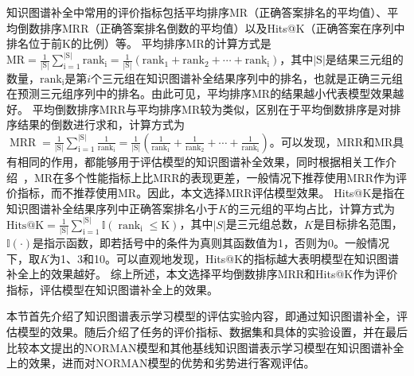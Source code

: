 \documentclass[algorithmlist, AutoFakeBold, AutoFakeSlant, figurelist, tablelist, nomlist, engineering]{seuthesix}
\begin{document}
知识图谱补全中常用的评价指标包括平均排序MR（正确答案排名的平均值）、平均倒数排序MRR（正确答案排名倒数的平均值）以及Hits@K（正确答案在序列中排名位于前K的比例）等。
平均排序MR的计算方式是$\mathrm{MR}=\frac{1}{|\mathrm{S}|} \sum_{\mathrm{i}=1}^{|\mathrm{S}|} \mathrm{rank}_{\mathrm{i}}=\frac{1}{|\mathrm{S}|}\left(\mathrm{rank}_1+\mathrm{rank}_2+\cdots+\mathrm{rank}_{\mathrm{i}}\right)$，其中$|\mathrm{S}|$是结果三元组的数量，$\mathrm{rank}_{\mathrm{i}}$是第$i$个三元组在知识图谱补全结果序列中的排名，也就是正确三元组在预测三元组序列中的排名。由此可见，平均排序MR的结果越小代表模型效果越好。
平均倒数排序MRR与平均排序MR较为类似，区别在于平均倒数排序是对排序结果的倒数进行求和，计算方式为$\operatorname{MRR}=\frac{1}{|\mathrm{S}|} \sum_{\mathrm{i}=1}^{|\mathrm{S}|} \frac{1}{\mathrm{rank}_{\mathrm{i}}}=\frac{1}{|\mathrm{S}|}\left(\frac{1}{\mathrm{rank}_1}+\frac{1}{\mathrm{rank}_2}+\cdots+\frac{1}{\mathrm{rank}_{\mathrm{i}}}\right)$。可以发现，MRR和MR具有相同的作用，都能够用于评估模型的知识图谱补全效果，同时根据相关工作介绍~\cite{hoyt2022unified}，MR在多个性能指标上比MRR的表现更差，一般情况下推荐使用MRR作为评价指标，而不推荐使用MR。因此，本文选择MRR评估模型效果。
Hits@K是指在知识图谱补全结果序列中正确答案排名小于$K$的三元组的平均占比，计算方式为$\mathrm{Hits@K}=\frac{1}{|\mathrm{S}|} \sum_{\mathrm{i}=1}^{|\mathrm{S}|} \mathbb{I}\left(\operatorname{rank}_{\mathrm{i}} \leq \mathrm{K}\right)$，其中$|S|$是三元组总数，$K$是目标排名范围，$\mathbb{I}\left(\cdot\right)$是指示函数，即若括号中的条件为真则其函数值为1，否则为0。一般情况下，取$K$为1、3和10。可以直观地发现，Hits@K的指标越大表明模型在知识图谱补全上的效果越好。
综上所述，本文选择平均倒数排序MRR和Hits@K作为评价指标，评估模型在知识图谱补全上的效果。

本节首先介绍了知识图谱表示学习模型的评估实验内容，即通过知识图谱补全，评估模型的效果。随后介绍了任务的评价指标、数据集和具体的实验设置，并在最后比较本文提出的NORMAN模型和其他基线知识图谱表示学习模型在知识图谱补全上的效果，进而对NORMAN模型的优势和劣势进行客观评估。
\end{document}
